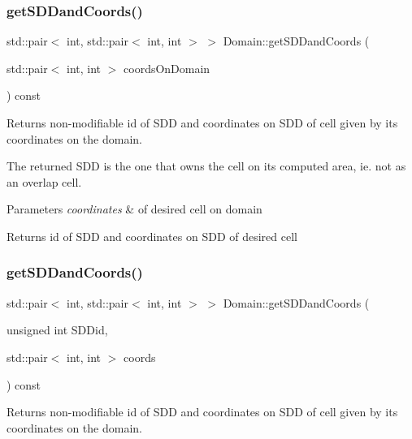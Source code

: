 \subsubsection{\texorpdfstring{get\+S\+D\+Dand\+Coords()}{getSDDandCoords()}\hspace{0.1cm}{\footnotesize\ttfamily [1/4]}}
{\footnotesize\ttfamily std\+::pair$<$ int, std\+::pair$<$ int, int $>$ $>$ Domain\+::get\+S\+D\+Dand\+Coords (\begin{DoxyParamCaption}\item[{std\+::pair$<$ int, int $>$}]{coords\+On\+Domain }\end{DoxyParamCaption}) const}



Returns non-\/modifiable id of S\+DD and coordinates on S\+DD of cell given by its coordinates on the domain. 

The returned S\+DD is the one that owns the cell on its computed area, ie. not as an overlap cell.


\begin{DoxyParams}{Parameters}
{\em coordinates} & of desired cell on domain\\
\hline
\end{DoxyParams}
\begin{DoxyReturn}{Returns}
id of S\+DD and coordinates on S\+DD of desired cell 
\end{DoxyReturn}
\mbox{\label{classDomain_af6442039d5c64b9a59b7a1bd94fc6bbb}} 
\subsubsection{\texorpdfstring{get\+S\+D\+Dand\+Coords()}{getSDDandCoords()}\hspace{0.1cm}{\footnotesize\ttfamily [2/4]}}
{\footnotesize\ttfamily std\+::pair$<$ int, std\+::pair$<$ int, int $>$ $>$ Domain\+::get\+S\+D\+Dand\+Coords (\begin{DoxyParamCaption}\item[{unsigned int}]{S\+D\+Did,  }\item[{std\+::pair$<$ int, int $>$}]{coords }\end{DoxyParamCaption}) const}



Returns non-\/modifiable id of S\+DD and coordinates on S\+DD of cell given by its coordinates on the domain. 

